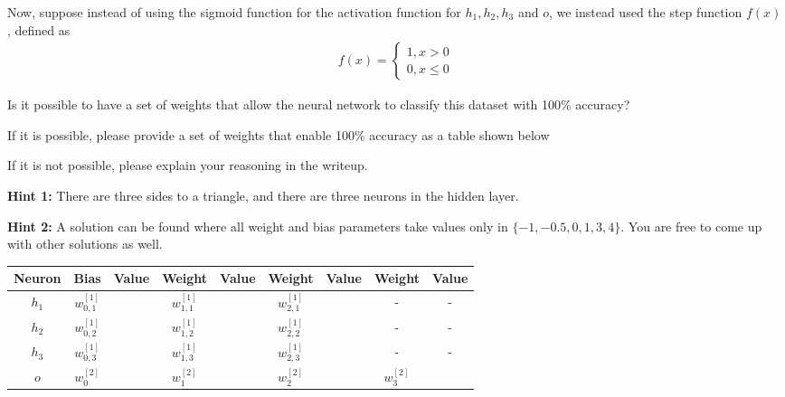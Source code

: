 \item {} Now, suppose instead of using the sigmoid function for the activation function for $h_1, h_2, h_3$ and $o$, we instead used the step function $f(x)$, defined as
\begin{align*}
f(x) = \begin{cases}
    1, x > 0 \\
    0, x \le 0
    \end{cases}
\end{align*}

Is it possible to have a set of weights that allow the neural network to classify this dataset with 100\% accuracy?

If it is possible, please provide a set of weights that enable 100\% accuracy as a table shown below

If it is not possible, please explain your reasoning in the writeup.

\textbf{Hint 1:} There are three sides to a triangle, and there are three neurons in the hidden layer.

\textbf{Hint 2:} A solution can be found where all weight and bias parameters take values only in $\{-1, -0.5, 0, 1, 3, 4 \}$. You are free to come up with other solutions as well.

\begin{table}[h]
\centering
\begin{tabular}{ |c||c|c||c|c||c|c||c|c|}
\hline
Neuron & Bias & Value &  Weight & Value & Weight & Value & Weight & Value\\
\hline
$h_1$ & $w_{0,1}^{[1]}$ &  & $w_{1,1}^{[1]}$ &  & $w_{2,1}^{[1]}$ &   & - & -\\
\hline
$h_2$ & $w_{0,2}^{[1]}$ &  & $w_{1,2}^{[1]}$ &  & $w_{2,2}^{[1]}$ &   & - & -\\
\hline
$h_3$ & $w_{0,3}^{[1]}$ &  & $w_{1,3}^{[1]}$ &  & $w_{2,3}^{[1]}$ &   & - & - \\
\hline
$o$ & $w_{0}^{[2]}$ &  & $w_{1}^{[2]}$ &  & $w_{2}^{[2]}$ &  & $w_{3}^{[2]}$ &  \\
\hline
\end{tabular}
\end{table}